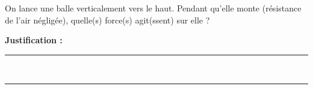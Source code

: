 On lance une balle verticalement vers le haut. Pendant qu'elle monte (résistance de l'air négligée), quelle(s) force(s) agit(ssent) sur elle ?

\choices

\noindent\textbf{Justification :} \hrulefill \\[2.5ex]
\rule{\linewidth}{0.4pt} \\[2.5ex]
\rule{\linewidth}{0.4pt}
\vfill
